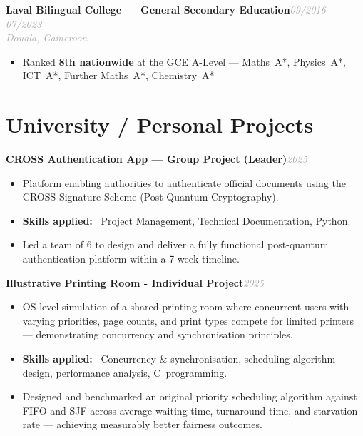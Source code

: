\documentclass[10pt, a4paper]{article}
\newcommand{\entryhead}[2]{%
  \noindent\textbf{#1}\hfill{\small\textit{\textcolor{darkgray}{#2}}}\\[-4pt]%
}
\newcommand{\entrysub}[1]{%
  {\small\textit{\textcolor{darkgray}{#1}}}\\[2pt]%
}
\newcommand{\blabel}[1]{\textbf{#1}\ }
\begin{document}
\vspace{4pt}
\entryhead{Laval Bilingual College — General Secondary Education}{09/2016 -- 07/2023}
\entrysub{Douala, Cameroon}
\begin{itemize}
  \item Ranked \textbf{8th nationwide} at the GCE A-Level —
        Maths~A*, Physics~A*, ICT~A*, Further Maths~A*, Chemistry~A*
\end{itemize}

\section{University / Personal Projects}

\entryhead{CROSS Authentication App \normalfont\small— Group Project (Leader)}{2025}
\begin{itemize}
  \item Platform enabling authorities to authenticate official documents using the CROSS Signature
        Scheme (Post-Quantum Cryptography).
  \item \blabel{Skills applied:} Project Management, Technical Documentation, Python.
  \item Led a team of 6 to design and deliver a fully functional post-quantum authentication
        platform within a 7-week timeline.
\end{itemize}

\vspace{4pt}
\entryhead{Illustrative Printing Room \normalfont\small- Individual Project}{2025}
\begin{itemize}
  \item OS-level simulation of a shared printing room where concurrent users with varying
        priorities, page counts, and print types compete for limited printers — demonstrating
        concurrency and synchronisation principles.
  \item \blabel{Skills applied:} Concurrency \& synchronisation, scheduling algorithm design,
        performance analysis, C~programming.
  \item Designed and benchmarked an original priority scheduling algorithm against FIFO and SJF
        across average waiting time, turnaround time, and starvation rate — achieving measurably
        better fairness outcomes.
\end{itemize}

\end{document}
